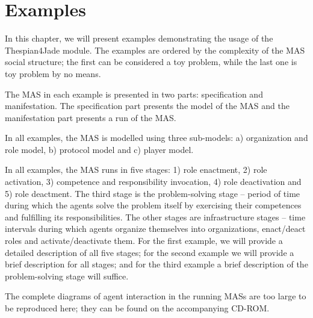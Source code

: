 
\chapter{Examples}

In this chapter, we will present examples demonstrating the usage of the Thespian4Jade module.
The examples are ordered by the complexity of the MAS social structure; the first can be considered a toy problem, while the last one is toy problem by no means.

The MAS in each example is presented in two parts: specification and manifestation.
The specification part presents the model of the MAS and the manifestation part presents a run of the MAS.

In all examples, the MAS is modelled using three sub-models: a) organization and role model, b) protocol model and c) player model.

In all examples, the MAS runs in five stages: 1) role enactment, 2) role activation, 3) competence and responsibility invocation, 4) role deactivation and 5) role deactment.
The third stage is the problem-solving stage -- period of time during which the agents solve the problem itself by exercising their competences and fulfilling its responsibilities.
The other stages are infrastructure stages -- time intervals during which agents organize themselves into organizations, enact/deact roles and activate/deactivate them.
For the first example, we will provide a detailed description of all five stages; for the second example we will provide a brief description for all stages; and for the third example a brief description of the problem-solving stage will suffice.

The complete diagrams of agent interaction in the running MASs are too large to be reproduced here; they can be found on the accompanying CD-ROM. 





